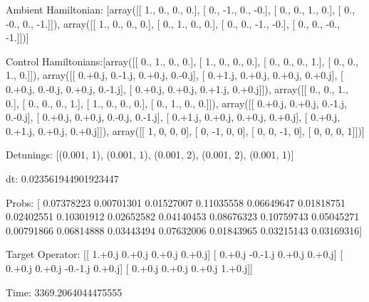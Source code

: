 \documentclass{article}
\begin{document}
    

\newpage

Ambient Hamiltonian: [array([[ 1.,  0.,  0.,  0.],
       [ 0., -1.,  0., -0.],
       [ 0.,  0.,  1.,  0.],
       [ 0., -0.,  0., -1.]]), array([[ 1.,  0.,  0.,  0.],
       [ 0.,  1.,  0.,  0.],
       [ 0.,  0., -1., -0.],
       [ 0.,  0., -0., -1.]])]

Control Hamiltonians:[array([[ 0.,  1.,  0.,  0.],
       [ 1.,  0.,  0.,  0.],
       [ 0.,  0.,  0.,  1.],
       [ 0.,  0.,  1.,  0.]]), array([[ 0.+0.j,  0.-1.j,  0.+0.j,  0.-0.j],
       [ 0.+1.j,  0.+0.j,  0.+0.j,  0.+0.j],
       [ 0.+0.j,  0.-0.j,  0.+0.j,  0.-1.j],
       [ 0.+0.j,  0.+0.j,  0.+1.j,  0.+0.j]]), array([[ 0.,  0.,  1.,  0.],
       [ 0.,  0.,  0.,  1.],
       [ 1.,  0.,  0.,  0.],
       [ 0.,  1.,  0.,  0.]]), array([[ 0.+0.j,  0.+0.j,  0.-1.j,  0.-0.j],
       [ 0.+0.j,  0.+0.j,  0.-0.j,  0.-1.j],
       [ 0.+1.j,  0.+0.j,  0.+0.j,  0.+0.j],
       [ 0.+0.j,  0.+1.j,  0.+0.j,  0.+0.j]]), array([[ 1,  0,  0,  0],
       [ 0, -1,  0,  0],
       [ 0,  0, -1,  0],
       [ 0,  0,  0,  1]])]

Detunings: [(0.001, 1), (0.001, 1), (0.001, 2), (0.001, 2), (0.001, 1)]

 dt: 0.023561944901923447

Probs: [ 0.07378223  0.00701301  0.01527007  0.11035558  0.06649647  0.01818751
  0.02402551  0.10301912  0.02652582  0.04140453  0.08676323  0.10759743
  0.05045271  0.00791866  0.06814888  0.03443494  0.07632006  0.01843965
  0.03215143  0.03169316]

Target Operator: [[ 1.+0.j  0.+0.j  0.+0.j  0.+0.j]
 [ 0.+0.j -0.-1.j  0.+0.j  0.+0.j]
 [ 0.+0.j  0.+0.j -0.-1.j  0.+0.j]
 [ 0.+0.j  0.+0.j  0.+0.j  1.+0.j]]

Time: 3369.2064044475555
\end{document}
